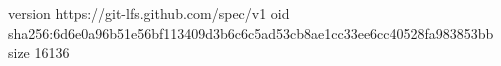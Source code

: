 version https://git-lfs.github.com/spec/v1
oid sha256:6d6e0a96b51e56bf113409d3b6c6c5ad53cb8ae1cc33ee6cc40528fa983853bb
size 16136
